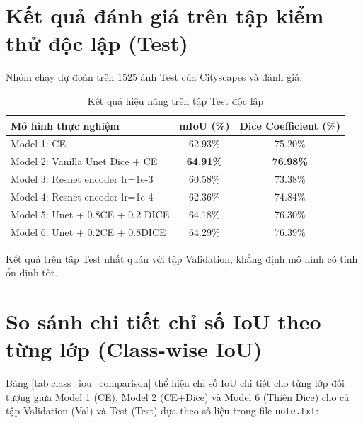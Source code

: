 \documentclass[a4paper,12pt]{report}
\begin{document}
\section{Kết quả đánh giá trên tập kiểm thử độc lập (Test)}
Nhóm chạy dự đoán trên 1525 ảnh Test của Cityscapes và đánh giá:
\begin{table}[H]
\centering
\caption{Kết quả hiệu năng trên tập Test độc lập}
\label{tab:test_results}
\begin{tabular}{lcc}
\toprule
\textbf{Mô hình thực nghiệm} & \textbf{mIoU (\%)} & \textbf{Dice Coefficient (\%)} \\
\midrule
Model 1: CE & 62.93\% & 75.20\% \\
Model 2: Vanilla Unet Dice + CE & \textbf{64.91\%} & \textbf{76.98\%} \\
Model 3: Resnet encoder lr=1e-3 & 60.58\% & 73.38\% \\
Model 4: Resnet encoder lr=1e-4 & 62.36\% & 74.84\% \\
Model 5: Unet + 0.8CE + 0.2 DICE & 64.18\% & 76.30\% \\
Model 6: Unet + 0.2CE + 0.8DICE & 64.29\% & 76.39\% \\
\bottomrule
\end{tabular}
\end{table}

Kết quả trên tập Test nhất quán với tập Validation, khẳng định mô hình có tính ổn định tốt.

\section{So sánh chi tiết chỉ số IoU theo từng lớp (Class-wise IoU)}
Bảng \ref{tab:class_iou_comparison} thể hiện chỉ số IoU chi tiết cho từng lớp đối tượng giữa Model 1 (CE), Model 2 (CE+Dice) và Model 6 (Thiên Dice) cho cả tập Validation (Val) và Test (Test) dựa theo số liệu trong file \texttt{note.txt}:
\end{document}
